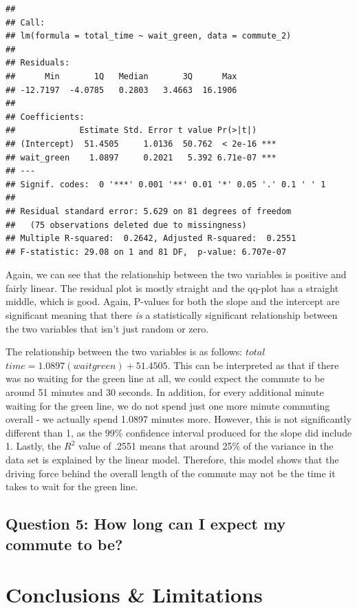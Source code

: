 \documentclass[
]{article}
\begin{document}
\begin{verbatim}
## 
## Call:
## lm(formula = total_time ~ wait_green, data = commute_2)
## 
## Residuals:
##      Min       1Q   Median       3Q      Max 
## -12.7197  -4.0785   0.2803   3.4663  16.1906 
## 
## Coefficients:
##             Estimate Std. Error t value Pr(>|t|)    
## (Intercept)  51.4505     1.0136  50.762  < 2e-16 ***
## wait_green    1.0897     0.2021   5.392 6.71e-07 ***
## ---
## Signif. codes:  0 '***' 0.001 '**' 0.01 '*' 0.05 '.' 0.1 ' ' 1
## 
## Residual standard error: 5.629 on 81 degrees of freedom
##   (75 observations deleted due to missingness)
## Multiple R-squared:  0.2642, Adjusted R-squared:  0.2551 
## F-statistic: 29.08 on 1 and 81 DF,  p-value: 6.707e-07
\end{verbatim}

Again, we can see that the relationship between the two variables is
positive and fairly linear. The residual plot is mostly straight and the
qq-plot has a straight middle, which is good. Again, P-values for both
the slope and the intercept are significant meaning that there \emph{is}
a statistically significant relationship between the two variables that
isn't just random or zero.

The relationship between the two variables is as follows:
\(total\)\(time = 1.0897(waitgreen) + 51.4505\). This can be interpreted
as that if there was no waiting for the green line at all, we could
expect the commute to be around 51 minutes and 30 seconds. In addition,
for every additional minute waiting for the green line, we do not spend
just one more minute commuting overall - we actually spend 1.0897
minutes more. However, this is not significantly different than 1, as
the 99\% confidence interval produced for the slope did include 1.
Lastly, the \(R^2\) value of .2551 means that around 25\% of the
variance in the data set is explained by the linear model. Therefore,
this model shows that the driving force behind the overall length of the
commute may not be the time it takes to wait for the green line.

\hypertarget{question-5-how-long-can-i-expect-my-commute-to-be}{%
\subsection{Question 5: How long can I expect my commute to
be?}\label{question-5-how-long-can-i-expect-my-commute-to-be}}

\hypertarget{conclusions-limitations}{%
\section{Conclusions \& Limitations}\label{conclusions-limitations}}
\end{document}
